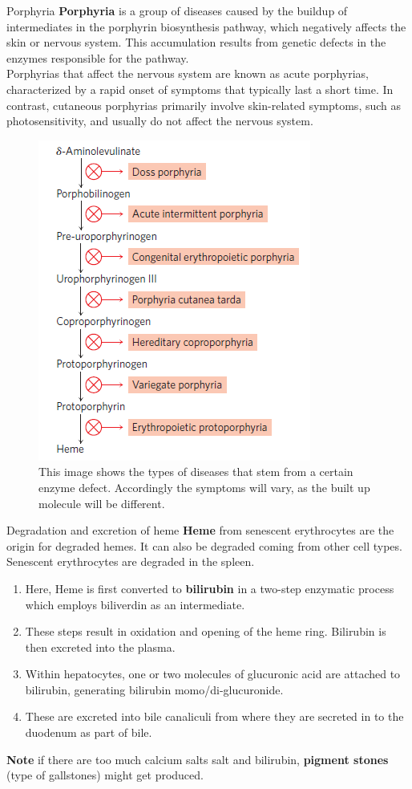\documentclass[../main.tex]{subfiles}
\begin{document}
\begin{RemarkWithTitel}{Porphyria}
	\textbf{\gls{Porphyria}} is a group of diseases caused by the buildup of intermediates in the porphyrin biosynthesis pathway, which negatively affects the skin or nervous system. This accumulation results from genetic defects in the enzymes responsible for the pathway.\\
	\indent Porphyrias that affect the nervous system are known as acute porphyrias, characterized by a rapid onset of symptoms that typically last a short time. In contrast, cutaneous porphyrias primarily involve skin-related symptoms, such as photosensitivity, and usually do not affect the nervous system.
\end{RemarkWithTitel}


\begin{figure}[H]
	\centering
	\includegraphics[width=0.3\linewidth]{por_sick}
	\caption{This image shows the types of diseases that stem from a certain enzyme defect. Accordingly the symptoms will vary, as the built up molecule will be different.}
	\label{fig:porsick}
\end{figure}

\begin{RemarkWithTitel}{Degradation and excretion of heme}
	\textbf{\gls{Heme}} from senescent erythrocytes are the origin for degraded hemes. It can also be degraded coming from other cell types. Senescent erythrocytes are degraded in the spleen. 
	\begin{enumerate}
		\item Here, Heme is first converted to \textbf{\gls{bilirubin}} in a two-step enzymatic process which employs biliverdin as an intermediate.
		\item These steps result in oxidation and opening of the heme ring. Bilirubin is then excreted into the plasma.
		\item Within hepatocytes, one or two molecules of glucuronic acid are attached to bilirubin, generating bilirubin momo/di-glucuronide. 
		\item These are excreted into bile canaliculi from where they are secreted in to the duodenum as part of bile.
	\end{enumerate} 
	
	\textbf{Note} if there are too much calcium salts salt and bilirubin, \textbf{pigment stones} (type of gallstones) might get produced. 
	
\end{RemarkWithTitel}
\end{document}
